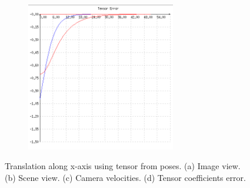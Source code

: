 \begin{figure}[ht!]
\begin{mdframed}[linecolor=black!30,backgroundcolor=black!5]
\begin{subfigure}{.48\linewidth}
    \caption{}
    \label{fig:ex1pvelocity}
  \end{subfigure}
  \begin{subfigure}{.48\linewidth}
    \centering
    \includegraphics[width=65mm]{figures/plots/ex1perror.png}
    \caption{}
    \label{fig:ex1perror}
  \end{subfigure}
  \caption{Translation along x-axis using tensor from poses. (a) Image view. (b) Scene view. (c) Camera velocities. (d) Tensor coefficients error.}
  \label{fig:ex1p}
\end{mdframed}
\end{figure}

